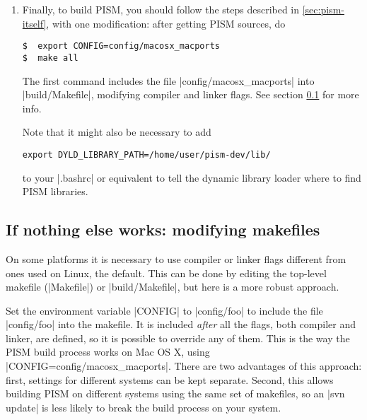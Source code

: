 \documentclass[11pt,final]{amsart}
\begin{document}
\begin{enumerate}
The next three commands completed the PETSc installation:
\begin{verbatim}
$  export PETSC_DIR=$PWD; export PETSC_ARCH=macosx;
$  ./config/configure.py --with-shared --with-dynamic --with-debugging=no \
        --with-fortran=0 --with-blas-lapack-dir=/usr/ --with-mpi-dir=/usr/
$  make all test
\end{verbatim}
\item Finally, to build PISM, you should follow the steps described in \ref{sec:pism-itself}, with one modification: after getting
  PISM sources, do
\begin{verbatim}
$  export CONFIG=config/macosx_macports
$  make all
\end{verbatim}
  The first command includes the file |config/macosx_macports| into |build/Makefile|, modifying compiler and linker flags. See
  section \ref{subsec:config} for more info.

  Note that it might also be necessary to add
\begin{verbatim}
export DYLD_LIBRARY_PATH=/home/user/pism-dev/lib/
\end{verbatim}
  to your |.bashrc| or equivalent to tell the dynamic library loader where to find PISM libraries.
\end{enumerate}


\clearpage
\subsection{If nothing else works: modifying makefiles}
\label{subsec:config}

On some platforms it is necessary to use compiler or linker flags different from ones used on
Linux, the default.  This can be done by editing the top-level makefile (|Makefile|) or |build/Makefile|, but here is a more robust approach.

Set the environment variable |CONFIG| to |config/foo| to include the file |config/foo| into the makefile.  It is included \emph{after} all the flags, both compiler and linker, are defined, so it is possible to override any of them.   This is the way the PISM build process works on Mac OS X, using |CONFIG=config/macosx_macports|.  There are two advantages of this approach: first, settings for different systems can be kept separate.  Second, this allows building PISM on different systems using the same set of makefiles, so an |svn update| is less likely to break the build process on your system.
\end{document}
